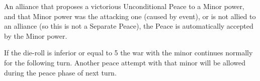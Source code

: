 An alliance that proposes a victorious Unconditional Peace to a Minor power,
and that Minor power was the attacking one (caused by event), or is not allied
to an alliance (so this is not a Separate Peace), the Peace is automatically
accepted by the Minor power.

If the die-roll is inferior or equal to 5 the war with the minor continues
normally for the following turn. Another peace attempt with that minor will be
allowed during the peace phase of next turn.

